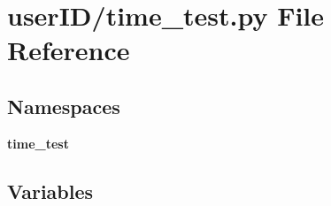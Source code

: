 \section{user\+I\+D/time\+\_\+test.py File Reference}
\label{time__test_8py}
\subsection*{Namespaces}
\begin{DoxyCompactItemize}
\item 
 \textbf{ time\+\_\+test}
\end{DoxyCompactItemize}
\subsection*{Variables}
